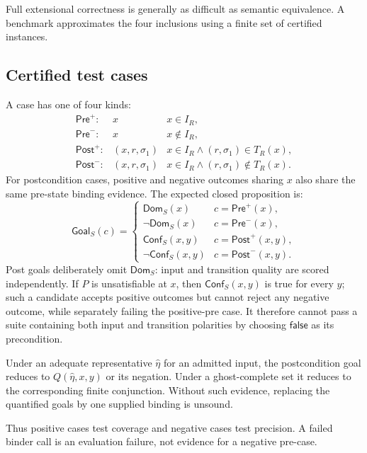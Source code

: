 \documentclass[10pt]{article}
\newcommand{\false}{\mathsf{false}}
\newcommand{\ghost}{\eta}
\newcommand{\goal}{\mathsf{Goal}}
\begin{document}
Full extensional correctness is generally as difficult as semantic
equivalence.  A benchmark approximates the four inclusions using a finite set
of certified instances.

\subsection{Certified test cases}

A case has one of four kinds:
\[
\begin{array}{lll}
\mathsf{Pre}^{+}:  & x                     & x\in I_R,\\
\mathsf{Pre}^{-}:  & x                     & x\notin I_R,\\
\mathsf{Post}^{+}: & (x,r,\sigma_1)        &
                        x\in I_R\land(r,\sigma_1)\in T_R(x),\\
\mathsf{Post}^{-}: & (x,r,\sigma_1)        &
                        x\in I_R\land(r,\sigma_1)\notin T_R(x).
\end{array}
\]
For postcondition cases, positive and negative outcomes sharing $x$ also share
the same pre-state binding evidence.  The expected closed proposition is:
\[
\goal_S(c)=
\begin{cases}
\mathsf{Dom}_S(x)
  & c=\mathsf{Pre}^{+}(x),\\
\neg\mathsf{Dom}_S(x)
  & c=\mathsf{Pre}^{-}(x),\\
\mathsf{Conf}_S(x,y)
  & c=\mathsf{Post}^{+}(x,y),\\
\neg\mathsf{Conf}_S(x,y)
  & c=\mathsf{Post}^{-}(x,y).
\end{cases}
\]
Post goals deliberately omit $\mathsf{Dom}_S$: input and transition quality
are scored independently.  If $P$ is unsatisfiable at $x$, then
$\mathsf{Conf}_S(x,y)$ is true for every $y$; such a candidate accepts positive
outcomes but cannot reject any negative outcome, while separately failing the
positive-pre case.  It therefore cannot pass a suite containing both input and
transition polarities by choosing $\false$ as its precondition.

Under an adequate representative $\widehat\ghost$ for an admitted input, the
postcondition goal reduces to $Q(\widehat\ghost,x,y)$ or its negation.  Under a
ghost-complete set it reduces to the corresponding finite conjunction.
Without such evidence, replacing the quantified goals by one supplied binding
is unsound.

Thus positive cases test coverage and negative cases test precision.  A failed
binder call is an evaluation failure, not evidence for a negative pre-case.
\end{document}
